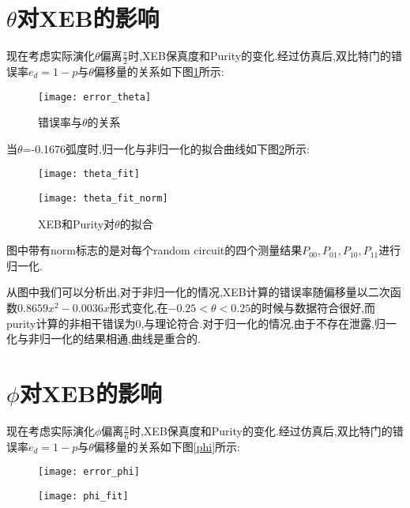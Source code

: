 \section{$\theta$对XEB的影响}

现在考虑实际演化$\theta$偏离$\frac{\pi}{2}$时,XEB保真度和Purity的变化.经过仿真后,双比特门的错误率$e_{d} = 1-p$与$\theta$偏移量的关系如下图\ref{theta}所示:
\begin{figure}
	\centering
	\texttt{[image: error\_theta]}
	\caption{错误率与$\theta$的关系} 
	\label{theta}
\end{figure}
当$\theta$=-0.1676弧度时,归一化与非归一化的拟合曲线如下图\ref{theta_fit}所示:
\begin{figure}[ht]
	\centering
	\begin{minipage}{0.48\linewidth}
		\texttt{[image: theta\_fit]}
	\end{minipage}
	\begin{minipage}{0.48\linewidth}
		\texttt{[image: theta\_fit\_norm]}
	\end{minipage}
	
	\caption{XEB和Purity对$\theta$的拟合} \label{theta_fit}
\end{figure}
图中带有norm标志的是对每个random circuit的四个测量结果$P_{00},P_{01},P_{10},P_{11}$进行归一化.

从图中我们可以分析出,对于非归一化的情况,XEB计算的错误率随偏移量以二次函数$0.8659x^{2}-0.0036x$形式变化,在$-0.25<\theta<0.25$的时候与数据符合很好,而purity计算的非相干错误为0,与理论符合.对于归一化的情况,由于不存在泄露,归一化与非归一化的结果相通,曲线是重合的.

\section{$\phi$对XEB的影响}

现在考虑实际演化$\phi$偏离$\frac{\pi}{6}$时,XEB保真度和Purity的变化.经过仿真后,双比特门的错误率$e_{d} = 1-p$与$\theta$偏移量的关系如下图\ref{phi}所示:
\begin{figure}[ht]
	\centering
	\begin{minipage}{0.48\linewidth}
		\texttt{[image: error\_phi]}
		\label{phi}
	\end{minipage}
	\begin{minipage}{0.48\linewidth}
		\texttt{[image: phi\_fit]}
		\label{phi_fit}
	\end{minipage}
	
	\caption{} 
\end{figure}


